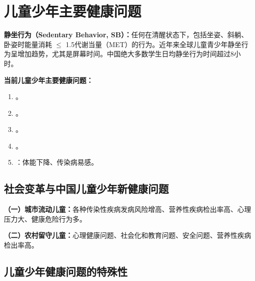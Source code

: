 \section{儿童少年主要健康问题}
\label{sec:health-problems}

\begin{defbox}
\textbf{静坐行为（Sedentary Behavior, SB）：}任何在清醒状态下，包括坐姿、斜躺、卧姿时能量消耗 $\leq$ 1.5代谢当量（MET）的行为。近年来全球儿童青少年静坐行为呈增加趋势，尤其是屏幕时间。中国绝大多数学生日均静坐行为时间超过8小时。
\end{defbox}

\begin{keybox}
\textbf{当前儿童少年主要健康问题：}

\begin{enumerate}[leftmargin=*]
    \item {}。
    \item {}。
    \item {}。
    \item {}。
    \item {}：体能下降、传染病易感。
\end{enumerate}
\end{keybox}

\subsection{社会变革与中国儿童少年新健康问题}

\begin{defbox}
\textbf{（一）城市流动儿童：}各种传染性疾病发病风险增高、营养性疾病检出率高、心理压力大、健康危险行为多。

\textbf{（二）农村留守儿童：}心理健康问题、社会化和教育问题、安全问题、营养性疾病检出率高。
\end{defbox}

\subsection{儿童少年健康问题的特殊性}

